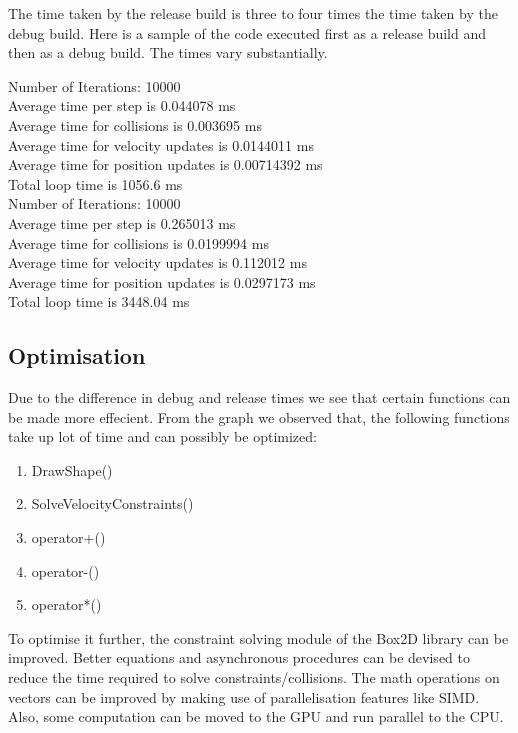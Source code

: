 \documentclass[a4paper,11pt]{article}
\begin{document}
The time taken by the release build is three to four times the time taken by the debug build. Here is a sample of the code executed first as a release build and then as a debug build. The times vary substantially.

Number of Iterations: 10000\\
Average time per step is 0.044078 ms\\
Average time for collisions is 0.003695 ms\\
Average time for velocity updates is 0.0144011 ms\\
Average time for position updates is 0.00714392 ms\\

Total loop time is 1056.6 ms\\

Number of Iterations: 10000\\
Average time per step is 0.265013 ms\\
Average time for collisions is 0.0199994 ms\\
Average time for velocity updates is 0.112012 ms\\
Average time for position updates is 0.0297173 ms\\

Total loop time is 3448.04 ms\\

\subsection{Optimisation}
Due to the difference in debug and release times we see that certain functions can be made more effecient.
From the graph we observed that, the following functions take up lot of time and can possibly be optimized:

\begin{enumerate}
\item DrawShape()
\item SolveVelocityConstraints()
\item operator+()
\item operator-()
\item operator*()
\end{enumerate}

To optimise it further, the constraint solving module of the Box2D library can be improved. Better equations and asynchronous procedures can be devised to reduce the time required to solve constraints/collisions. The math operations on vectors can be improved by making use of parallelisation features like SIMD. Also, some computation can be moved to the GPU and run parallel to the CPU.

\nocite{*}



\end{document}

